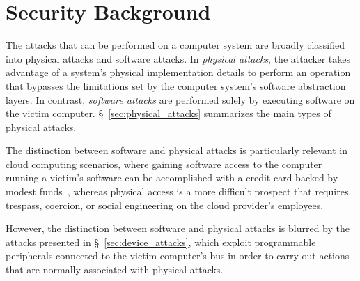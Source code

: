 \section{Security Background}
\label{sec:security_background}

The attacks that can be performed on a computer system are broadly classified
into physical attacks and software attacks. In \textit{physical attacks}, the
attacker takes advantage of a system's physical implementation details to
perform an operation that bypasses the limitations set by the computer
system's software abstraction layers. In contrast, \textit{software attacks}
are performed solely by executing software on the victim computer.
\S~\ref{sec:physical_attacks} summarizes the main types of physical attacks.

The distinction between software and physical attacks is particularly relevant
in cloud computing scenarios, where gaining software access to the computer
running a victim's software can be accomplished with a credit card backed by
modest funds~\cite{ristenpart2009colocation}, whereas physical access is a
more difficult prospect that requires trespass, coercion, or social engineering
on the cloud provider's employees.

However, the distinction between software and physical attacks is blurred by
the attacks presented in \S~\ref{sec:device_attacks}, which exploit
programmable peripherals connected to the victim computer's bus in order to
carry out actions that are normally associated with physical attacks.









